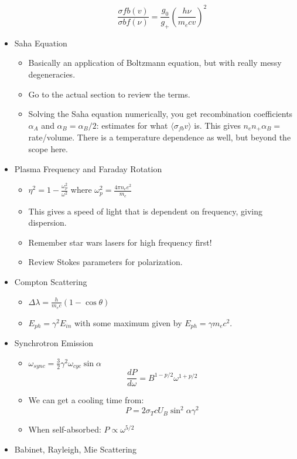 \documentclass{article}
\begin{document}
\begin{itemize}
\begin{itemize}
        $$
        \frac{\sigma{fb}(v)}{\sigma{bf}(\nu)} = \frac{g_0}{g_+} \left(\frac{h\nu}{m_e cv}\right)^2
        $$
    \end{itemize}
    
    \item Saha Equation
    \begin{itemize}
        \item Basically an application of Boltzmann equation, but with really messy degeneracies. 
        \item Go to the actual section to review the terms. 
        \item Solving the Saha equation numerically, you get recombination coefficients $\alpha_A$ and $\alpha_B = \alpha_B/2$: estimates for what $\langle \sigma_{fb} v \rangle$ is. This gives $n_e n_+ \alpha_B = $ rate/volume. There is a temperature dependence as well, but beyond the scope here. 
    \end{itemize}
    
    \item Plasma Frequency and Faraday Rotation
    \begin{itemize}
    
        \item $\eta^2 = 1 - \frac{\omega_p^2}{\omega^2}$ where $\omega_p^2 = \frac{4\pi n_e e^2}{m_e}$
        \item This gives a speed of light that is dependent on frequency, giving dispersion. 
        \item Remember star wars lasers for high frequency first!
        \item Review Stokes parameters for polarization. 
    \end{itemize}
    
    \item Compton Scattering
    \begin{itemize}
        \item $\Delta \lambda = \frac{h}{m_e c} \left(1-\cos\theta\right)$
        
        \item $E_{ph} = \gamma^2 E_{in}$ with some maximum given by $E_{ph} = \gamma m_e c^2$.
    \end{itemize}
    
    \item Synchrotron Emission 
    \begin{itemize}
        \item $\omega_{sync} = \frac32 \gamma^2 \omega_{cyc} \sin\alpha$
        $$
        \frac{dP}{d\omega} = B^{1-p/2} \omega^{1+p/2}
        $$
        \item We can get a cooling time from:
        $$
        P = 2\sigma_T c U_B \sin^2\alpha \gamma^2
        $$
        \item When self-absorbed: $P \propto \omega^{5/2}$
    \end{itemize}
    
    \item Babinet, Rayleigh, Mie Scattering
    
\end{itemize}
\end{document}
